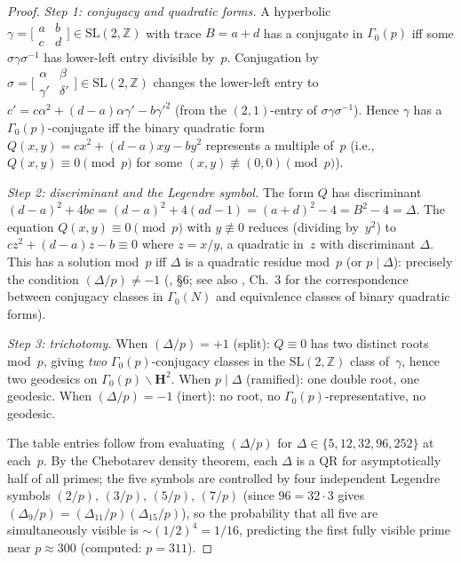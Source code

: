 \begin{proof}
\emph{Step 1: conjugacy and quadratic forms.}
A hyperbolic $\gamma = \bigl[\begin{smallmatrix}a&b\\c&d
\end{smallmatrix}\bigr] \in \mathrm{SL}(2,\mathbb{Z})$
with trace $B = a{+}d$ has a conjugate in $\Gamma_0(p)$
iff some $\sigma\gamma\sigma^{-1}$ has lower-left entry
divisible by~$p$.
Conjugation by $\sigma = \bigl[\begin{smallmatrix}
\alpha&\beta\\\gamma'&\delta'\end{smallmatrix}\bigr]
\in \mathrm{SL}(2,\mathbb{Z})$ changes the lower-left
entry to $c' = c\alpha^2 + (d{-}a)\alpha\gamma' - b\gamma'^2$
(from the $(2,1)$-entry of $\sigma\gamma\sigma^{-1}$).
Hence $\gamma$ has a $\Gamma_0(p)$-conjugate iff the
binary quadratic form
$Q(x,y) = cx^2 + (d{-}a)xy - by^2$
represents a multiple of~$p$
(i.e., $Q(x,y) \equiv 0 \pmod{p}$ for some
$(x,y) \not\equiv (0,0) \pmod{p}$).

\emph{Step 2: discriminant and the Legendre symbol.}
The form $Q$ has discriminant
$(d{-}a)^2 + 4bc = (d{-}a)^2 + 4(ad{-}1) = (a{+}d)^2 - 4
= B^2 - 4 = \Delta$.
The equation $Q(x,y) \equiv 0 \pmod{p}$ with $y \not\equiv 0$
reduces (dividing by~$y^2$) to $cz^2 + (d{-}a)z - b \equiv 0$
where $z = x/y$, a quadratic in~$z$ with discriminant $\Delta$.
This has a solution mod~$p$ iff $\Delta$ is a quadratic residue
mod~$p$ (or $p \mid \Delta$):
precisely the condition $(\Delta/p) \ne -1$
(\citealt{Buser1992}, \S6; see also
\citealt{Katok1992}, Ch.~3 for the correspondence
between conjugacy classes in $\Gamma_0(N)$ and equivalence
classes of binary quadratic forms).

\emph{Step 3: trichotomy.}
When $(\Delta/p) = +1$ (split): $Q \equiv 0$ has two distinct roots
mod~$p$, giving \emph{two} $\Gamma_0(p)$-conjugacy classes in the
$\mathrm{SL}(2,\mathbb{Z})$ class of~$\gamma$, hence two geodesics
on $\Gamma_0(p)\backslash\mathbf{H}^2$.
When $p \mid \Delta$ (ramified): one double root, one geodesic.
When $(\Delta/p) = -1$ (inert): no root, no
$\Gamma_0(p)$-representative, no geodesic.

The table entries follow from evaluating $(\Delta/p)$ for
$\Delta \in \{5, 12, 32, 96, 252\}$ at each~$p$.
By the Chebotarev density theorem, each $\Delta$ is a QR for
asymptotically half of all primes; the five symbols are controlled
by four independent Legendre symbols $(2/p)$, $(3/p)$, $(5/p)$,
$(7/p)$ (since $96 = 32 \cdot 3$ gives $(\Delta_9/p) =
(\Delta_{11}/p)(\Delta_{15}/p)$), so the probability that all
five are simultaneously visible is $\sim (1/2)^4 = 1/16$,
predicting the first fully visible prime near
$p \approx 300$ (computed: $p = 311$).
\end{proof}

